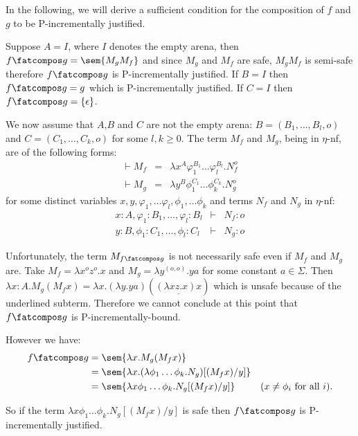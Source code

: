 In the following, we will derive a sufficient condition for the composition of $f$ and $g$ to be P-incrementally justified.


Suppose $A=I$, where $I$ denotes the empty arena, then $f\fatcompos g = \sem{M_g M_f}$ and since $M_g$ and $M_f$ are safe, $M_g M_f$ is semi-safe therefore $f\fatcompos g$ is P-incrementally justified.
If $B=I$ then $f\fatcompos g = g$ which is P-incrementally justified.
If $C=I$ then $f\fatcompos g = \{ \epsilon \}$.

We now assume that $A$,$B$ and $C$ are not the empty arena: $B=(B_1,\ldots,B_l,o)$ and $C=(C_1,\ldots,C_k,o)$ for some $l,k\geq 0$. The term $M_f$ and $M_g$, being in $\eta$-nf, are of the following forms:
\begin{eqnarray*}
\vdash M_f &=& \lambda x^A \varphi_1^{B_1} \ldots \varphi_l^{B_l} . N_f^o\\
\vdash  M_g &=& \lambda y^B \phi_1^{C_1} \ldots \phi_k^{C_k} . N_g^o
\end{eqnarray*}
for some distinct variables $x,y,\varphi_1, \dots \varphi_l, \phi_1, \dots \phi_k$ and
terms $N_f$ and $N_g$ in $\eta$-nf:
\begin{eqnarray*}
x:A, \varphi_1:B_1, \dots, \varphi_l:B_l &\vdash& N_f :o \\
y:B, \phi_1:C_1, \dots, \phi_l:C_l &\vdash& N_g :o
\end{eqnarray*}


 

Unfortunately, the term $M_{f\fatcompos g}$ is not necessarily safe even if $M_f$ and $M_g$ are. Take $M_f = \lambda x^o z^o.x$ and
$M_g = \lambda y^{(o,o)} . y a$ for some constant $a\in \Sigma$.
Then $\lambda x:A . M_g (M_f x) = \lambda x . (\lambda y . y a) ( \underline{(\lambda x z.x) x} )$ which is unsafe because of the underlined subterm. Therefore we cannot conclude at this point that $f\fatcompos g$ is P-incrementally-bound.

However we have:
\begin{align*}
f\fatcompos g &= \sem{\lambda x . M_g (M_f x)} \\
 &= \sem{\lambda x . (\lambda \phi_1\ldots \phi_k . N_g) [(M_f x) / y]} \\
&= \sem{\lambda x \phi_1 \dots \phi_k. N_g [(M_f x) / y]}
& \mbox{($x\neq\phi_i$ for all $i$)}.
\end{align*}

So if the term  $\lambda x \phi_1 \dots \phi_k. N_g [(M_f x) / y]$ is safe then $f\fatcompos g$ is P-incrementally justified.

